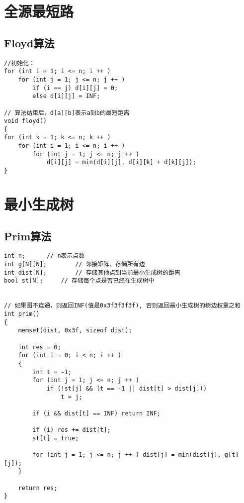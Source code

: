 \documentclass[12pt,a4paper,UTF16]{ctexbook}
\theoremstyle{plain}
\begin{document}
\section{全源最短路}
\subsection{Floyd算法}
\begin{lstlisting}
//初始化：
for (int i = 1; i <= n; i ++ )
    for (int j = 1; j <= n; j ++ )
        if (i == j) d[i][j] = 0;
        else d[i][j] = INF;

// 算法结束后，d[a][b]表示a到b的最短距离
void floyd()
{
for (int k = 1; k <= n; k ++ )
    for (int i = 1; i <= n; i ++ )
        for (int j = 1; j <= n; j ++ )
            d[i][j] = min(d[i][j], d[i][k] + d[k][j]);
}
\end{lstlisting}

\section{最小生成树}
\subsection{Prim算法}
\begin{lstlisting}
int n;      // n表示点数
int g[N][N];        // 邻接矩阵，存储所有边
int dist[N];        // 存储其他点到当前最小生成树的距离
bool st[N];     // 存储每个点是否已经在生成树中


// 如果图不连通，则返回INF(值是0x3f3f3f3f), 否则返回最小生成树的树边权重之和
int prim()
{
    memset(dist, 0x3f, sizeof dist);

    int res = 0;
    for (int i = 0; i < n; i ++ )
    {
        int t = -1;
        for (int j = 1; j <= n; j ++ )
            if (!st[j] && (t == -1 || dist[t] > dist[j]))
                t = j;

        if (i && dist[t] == INF) return INF;

        if (i) res += dist[t];
        st[t] = true;

        for (int j = 1; j <= n; j ++ ) dist[j] = min(dist[j], g[t][j]);
    }

    return res;
}
\end{lstlisting}
\end{document}
